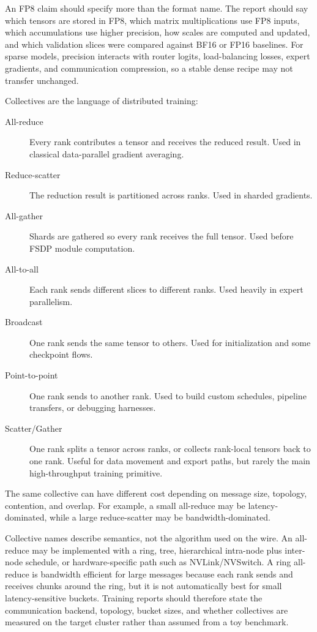 An FP8 claim should specify more than the format name. The report should say which tensors are stored in FP8, which matrix multiplications use FP8 inputs, which accumulations use higher precision, how scales are computed and updated, and which validation slices were compared against BF16 or FP16 baselines. For sparse models, precision interacts with router logits, load-balancing losses, expert gradients, and communication compression, so a stable dense recipe may not transfer unchanged.

Collectives are the language of distributed training:
\begin{description}
\item[All-reduce] Every rank contributes a tensor and receives the reduced result. Used in classical data-parallel gradient averaging.
\item[Reduce-scatter] The reduction result is partitioned across ranks. Used in sharded gradients.
\item[All-gather] Shards are gathered so every rank receives the full tensor. Used before FSDP module computation.
\item[All-to-all] Each rank sends different slices to different ranks. Used heavily in expert parallelism.
\item[Broadcast] One rank sends the same tensor to others. Used for initialization and some checkpoint flows.
\item[Point-to-point] One rank sends to another rank. Used to build custom schedules, pipeline transfers, or debugging harnesses.
\item[Scatter/Gather] One rank splits a tensor across ranks, or collects rank-local tensors back to one rank. Useful for data movement and export paths, but rarely the main high-throughput training primitive.
\end{description}
The same collective can have different cost depending on message size, topology, contention, and overlap. For example, a small all-reduce may be latency-dominated, while a large reduce-scatter may be bandwidth-dominated.

Collective names describe semantics, not the algorithm used on the wire. An all-reduce may be implemented with a ring, tree, hierarchical intra-node plus inter-node schedule, or hardware-specific path such as NVLink/NVSwitch. A ring all-reduce is bandwidth efficient for large messages because each rank sends and receives chunks around the ring, but it is not automatically best for small latency-sensitive buckets. Training reports should therefore state the communication backend, topology, bucket sizes, and whether collectives are measured on the target cluster rather than assumed from a toy benchmark.

